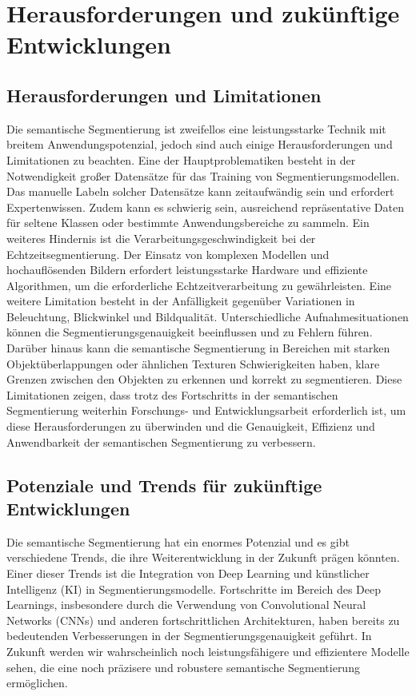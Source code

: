 \chapter{Herausforderungen und zukünftige Entwicklungen}
\section{Herausforderungen und Limitationen}
Die semantische Segmentierung ist zweifellos eine leistungsstarke Technik mit
breitem Anwendungspotenzial, jedoch sind auch einige Herausforderungen und
Limitationen zu beachten. Eine der Hauptproblematiken besteht in der
Notwendigkeit großer Datensätze für das Training von Segmentierungsmodellen.
Das manuelle Labeln solcher Datensätze kann zeitaufwändig sein und erfordert
Expertenwissen. Zudem kann es schwierig sein, ausreichend repräsentative Daten
für seltene Klassen oder bestimmte Anwendungsbereiche zu sammeln. Ein weiteres
Hindernis ist die Verarbeitungsgeschwindigkeit bei der Echtzeitsegmentierung.
Der Einsatz von komplexen Modellen und hochauflösenden Bildern erfordert
leistungsstarke Hardware und effiziente Algorithmen, um die erforderliche
Echtzeitverarbeitung zu gewährleisten. Eine weitere Limitation besteht in der
Anfälligkeit gegenüber Variationen in Beleuchtung, Blickwinkel und
Bildqualität. Unterschiedliche Aufnahmesituationen können die
Segmentierungsgenauigkeit beeinflussen und zu Fehlern führen. Darüber hinaus
kann die semantische Segmentierung in Bereichen mit starken Objektüberlappungen
oder ähnlichen Texturen Schwierigkeiten haben, klare Grenzen zwischen den
Objekten zu erkennen und korrekt zu segmentieren. Diese Limitationen zeigen,
dass trotz des Fortschritts in der semantischen Segmentierung weiterhin
Forschungs- und Entwicklungsarbeit erforderlich ist, um diese Herausforderungen
zu überwinden und die Genauigkeit, Effizienz und Anwendbarkeit der semantischen
Segmentierung zu verbessern.

\section{Potenziale und Trends für zukünftige Entwicklungen}

Die semantische Segmentierung hat ein enormes Potenzial und es gibt
verschiedene Trends, die ihre Weiterentwicklung in der Zukunft prägen könnten.
Einer dieser Trends ist die Integration von Deep Learning und künstlicher
Intelligenz (KI) in Segmentierungsmodelle. Fortschritte im Bereich des Deep
Learnings, insbesondere durch die Verwendung von Convolutional Neural Networks
(CNNs) und anderen fortschrittlichen Architekturen, haben bereits zu
bedeutenden Verbesserungen in der Segmentierungsgenauigkeit geführt. In Zukunft
werden wir wahrscheinlich noch leistungsfähigere und effizientere Modelle
sehen, die eine noch präzisere und robustere semantische Segmentierung
ermöglichen.

